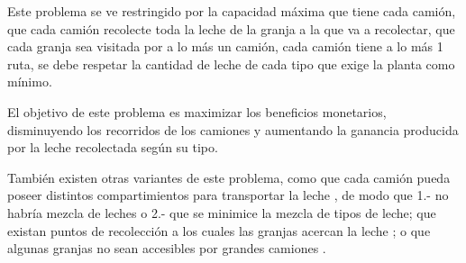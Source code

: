 Este problema se ve restringido por la capacidad máxima que tiene cada camión, que cada camión recolecte toda la leche de la granja a la que va a recolectar, que cada granja sea visitada por a lo más un camión, cada camión tiene a lo más 1 ruta, se debe respetar la cantidad de leche de cada tipo que exige la planta como mínimo.

El objetivo de este problema es maximizar los beneficios monetarios, disminuyendo los recorridos de los camiones y aumentando la ganancia producida por la leche recolectada según su tipo.

También existen otras variantes de este problema, como que cada camión pueda poseer distintos compartimientos para transportar la leche \cite{memeticalgorithmtabusearch}, de modo que 1.- no habría mezcla de leches o 2.- que se minimice la mezcla de tipos de leche; que existan puntos de recolección a los cuales las granjas acercan la leche \cite{MilkBlendingPoints}; o que algunas granjas no sean accesibles por grandes camiones \cite{MilkWithIncompatibilityConstraints}.
